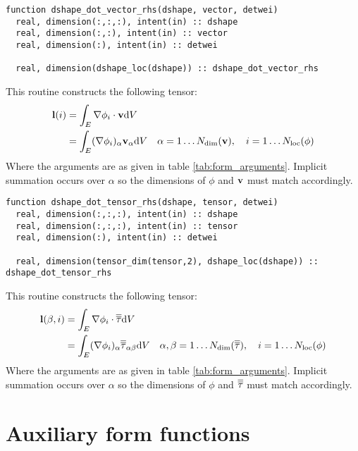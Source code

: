 \documentclass[a4paper, 11pt]{book}
\begin{document}

\begin{lstlisting}
function dshape_dot_vector_rhs(dshape, vector, detwei)
  real, dimension(:,:,:), intent(in) :: dshape
  real, dimension(:,:), intent(in) :: vector
  real, dimension(:), intent(in) :: detwei

  real, dimension(dshape_loc(dshape)) :: dshape_dot_vector_rhs 
\end{lstlisting}

This routine constructs the following tensor:
\begin{equation}
  \begin{split}
  \mathbf{l}(i)&=\int_E \nabla\phi_{i}\cdot \mathbf{v} \mathrm{d} V\\
  &=\int_E (\nabla\phi_{i})_\alpha \mathbf{v}_\alpha \mathrm{d} V\quad \alpha=1\ldots N_\mathrm{dim}(\mathbf{v}),\quad i=1\ldots N_\mathrm{loc}(\phi)
  \end{split}
\end{equation}
Where the arguments are as given in table \ref{tab:form_arguments}. Implicit
summation occurs over $\alpha$ so the dimensions of $\phi$ and $\mathbf{v}$ must
match accordingly.



\begin{lstlisting}
function dshape_dot_tensor_rhs(dshape, tensor, detwei)
  real, dimension(:,:,:), intent(in) :: dshape
  real, dimension(:,:,:), intent(in) :: tensor
  real, dimension(:), intent(in) :: detwei

  real, dimension(tensor_dim(tensor,2), dshape_loc(dshape)) :: dshape_dot_tensor_rhs 
\end{lstlisting}

This routine constructs the following tensor:
\begin{equation}
  \begin{split}
  \mathbf{l}(\beta,i)&=\int_E \nabla\phi_{i}\cdot \overline{\overline{\tau}} \mathrm{d} V\\
  &=\int_E (\nabla\phi_{i})_\alpha \overline{\overline{\tau}}_{\alpha\beta} \mathrm{d} V
  \quad \alpha,\beta=1\ldots N_\mathrm{dim}(\overline{\overline{\tau}}),\quad i=1\ldots N_\mathrm{loc}(\phi)
  \end{split}
\end{equation}
Where the arguments are as given in table \ref{tab:form_arguments}. Implicit
summation occurs over $\alpha$ so the dimensions of $\phi$ and $\overline{\overline{\tau}}$ must
match accordingly.

\section{Auxiliary form functions}
\end{document}
